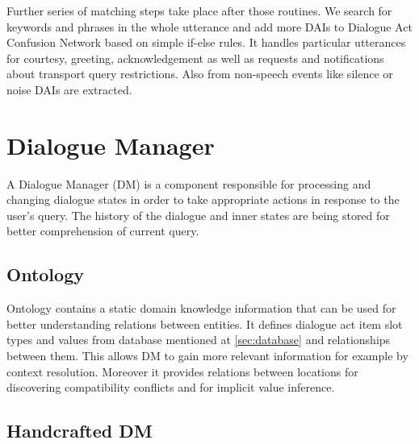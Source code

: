 Further series of matching steps take place after those routines.
We search for keywords and phrases in the whole utterance and add more DAIs to Dialogue Act Confusion Network based on simple if-else rules.
It handles particular utterances for courtesy, greeting, acknowledgement as well as requests and notifications about transport query restrictions.
Also from non-speech events like silence or noise DAIs are extracted. %

\section{Dialogue Manager}

A Dialogue Manager (DM) is a component responsible for processing and changing dialogue states in order to take appropriate actions in response to the user's query.
The history of the dialogue and inner states are being stored for better comprehension of current query.

\subsection{Ontology}

Ontology contains a static domain knowledge information that can be used for better understanding relations between entities.
It defines dialogue act item slot types and values from database mentioned at \ref{sec:database} and relationships between them.
This allows DM to gain more relevant information for example by context resolution.
Moreover it provides relations between locations for discovering compatibility conflicts and for implicit value inference.

\subsection{Handcrafted DM}

